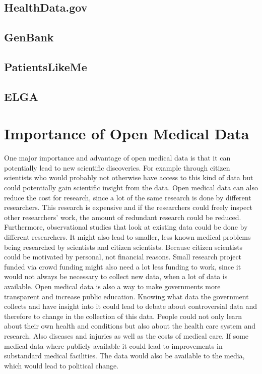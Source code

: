 \documentclass[a4paper, 11pt]{article}
\begin{document}
\subsection{HealthData.gov}

\subsection{GenBank}

\subsection{PatientsLikeMe}

\subsection{ELGA}

\section{Importance of Open Medical Data}\label{sec:importance}


One major importance and advantage of open medical data is that it can potentially lead to new scientific discoveries. For example through citizen scientists who would probably not otherwise have access to this kind of data but could potentially gain scientific insight from the data. \cite{Hoffman2015}
Open medical data can also reduce the cost for research, since a lot of the same research is done by different researchers. This research is expensive and if the researchers could freely inspect other researchers' work, the amount of redundant research could be reduced. Furthermore, observational studies that look at existing data could be done by different researchers. It might also lead to smaller, less known medical problems being researched by scientists and citizen scientists. Because citizen scientists could be motivated by personal, not financial reasons. Small research project funded via crowd funding might also need a lot less funding to work, since it would not always be necessary to collect new data, when a lot of data is available. \cite{Hoffman2015}
Open medical data is also a way to make governments more transparent and increase public education. Knowing what data the government collects and have insight into it could lead to debate about controversial data and therefore to change in the collection of this data. People could not only learn about their own health and conditions but also about the health care system and research. Also diseases and injuries as well as the costs of medical care. If some medical data where publicly available it could lead to improvements in substandard medical facilities. The data would also be available to the media, which would lead to political change. \cite{Hoffman2015}
\end{document}
